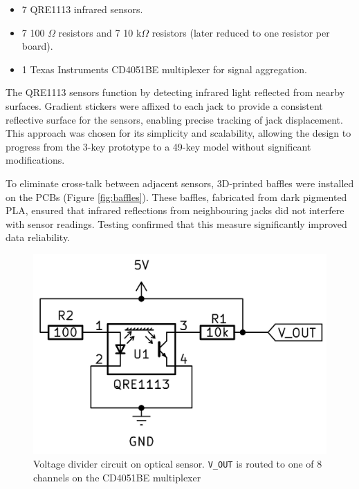 \begin{itemize}
    \item 7 QRE1113 infrared sensors.
    \item 7 100 $\Omega$ resistors and 7 10 k$\Omega$ resistors (later reduced to one resistor per board).
    \item 1 Texas Instruments CD4051BE multiplexer for signal aggregation.
\end{itemize}

The QRE1113 sensors function by detecting infrared light reflected from nearby surfaces. Gradient stickers were affixed to each jack to provide a consistent reflective surface for the sensors, enabling precise tracking of jack displacement. This approach was chosen for its simplicity and scalability, allowing the design to progress from the 3-key prototype to a 49-key model without significant modifications.

To eliminate cross-talk between adjacent sensors, 3D-printed baffles were installed on the PCBs (Figure \ref{fig:baffles}). These baffles, fabricated from dark pigmented PLA, ensured that infrared reflections from neighbouring jacks did not interfere with sensor readings. Testing confirmed that this measure significantly improved data reliability.

\begin{figure}  
  \centering
  \includegraphics[width=\linewidth]{src/images/simple-schematic-bw-.jpg} 
  \caption{Voltage divider circuit on optical sensor. \texttt{V\_OUT} is routed to one of 8 channels on the CD4051BE multiplexer}
  \Description{} 
  \label{fig:simple-schematic}
\end{figure}

